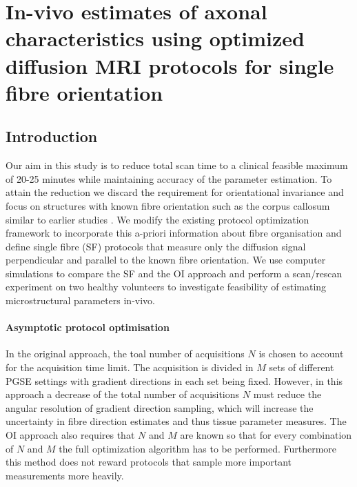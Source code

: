 \section{In-vivo estimates of axonal characteristics using optimized diffusion MRI protocols for single fibre orientation}
\subsection*{Introduction}
Our aim in this study is to reduce total scan time to a clinical feasible maximum of 20-25 minutes while maintaining accuracy of the parameter estimation. To attain the reduction we discard the requirement for orientational invariance and focus on structures with known fibre orientation such as the corpus callosum similar to earlier studies \cite{assaf2008,barazany2009}. We modify the existing protocol optimization framework \cite{alexander2008} to incorporate this a-priori information about fibre organisation and define single fibre (SF) protocols that measure only the diffusion signal perpendicular and parallel to the known fibre orientation. We use computer simulations to compare the SF and the OI approach and perform a scan/rescan experiment on two healthy volunteers to investigate feasibility of estimating microstructural parameters in-vivo. 

\paragraph{Asymptotic protocol optimisation}
In the original approach, the toal number of acquisitions $N$ is chosen to account for the acquisition time limit. The acquisition is divided in $M$ sets of different PGSE settings with gradient directions in each set being fixed. However, in this approach a decrease of the total number of acquisitions $N$ must reduce the angular resolution of gradient direction sampling, which will increase the uncertainty in fibre direction estimates and thus tissue parameter measures. The OI approach also requires that $N$ and $M$ are known so that for every combination of $N$ and $M$ the full optimization algorithm has to be performed. Furthermore this method does not reward protocols that sample more important measurements more heavily.

